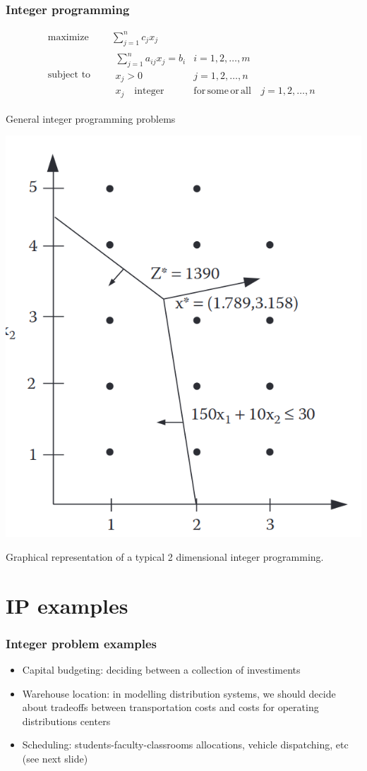 \documentclass[c]{beamer}
\begin{document}
\begin{frame}
  \frametitle{Integer programming}

  \begin{equation*}
    \begin{aligned}
      \text{maximize } \quad & \sum_{j=1}^{n} c_j x_j \\
      \text{subject to }\quad &
      \begin{array}{rcl}
        \sum_{j=1}^n a_{ij} x_j= b_i&i=1,2,\ldots,m&  \\
        x_j > 0 &j=1,2,\ldots,n&\\
        x_j \quad \mathrm{integer} & \mathrm{for\,some\,or\,all\,} & j=1,2,\ldots,n
      \end{array}
    \end{aligned}
  \end{equation*}



\end{frame}
\begin{frame}{General integer programming problems}
    \begin{center}
      \includegraphics[width=0.4\linewidth]{../figures/IntegerProgramming.png}
    \end{center}
    Graphical representation of a typical 2 dimensional integer programming\cite{carter}.
  \end{frame}

\section{IP examples}

  \begin{frame}
    \frametitle{Integer problem examples}
  
    \begin{itemize}
      \item Capital budgeting: deciding between a collection of investiments
      \item Warehouse location: in modelling distribution systems, we should decide about tradeoffs between transportation costs and costs for operating distributions centers
      \item Scheduling: students-faculty-classrooms allocations, vehicle dispatching, etc (see next slide)
    \end{itemize}
  
  \end{frame}
\end{document}
